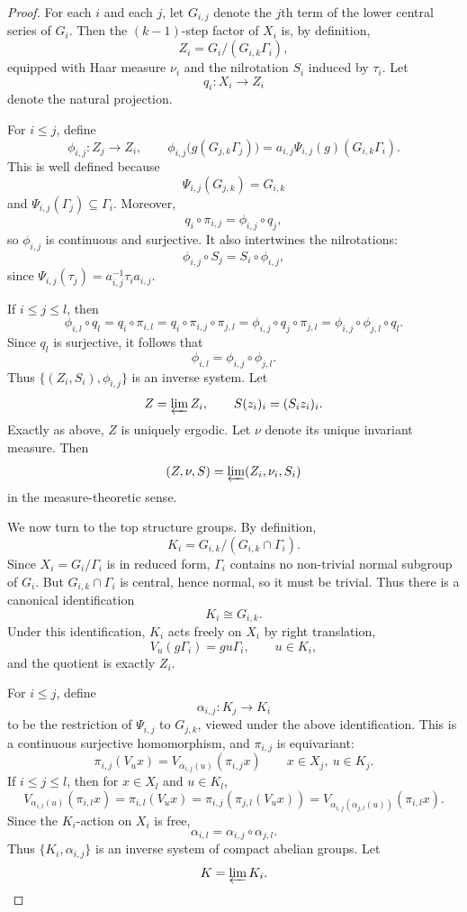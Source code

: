 \documentclass[12pt]{amsart}
\theoremstyle{plain}
\theoremstyle{definition}
\begin{document}
\begin{proof}
    For each $i$ and each $j$, let $G_{i,j}$ denote the $j$th term of the lower central series of $G_i$.
    Then the $(k-1)$-step factor of $X_i$ is, by definition,
    \[
    Z_i=G_i/(G_{i,k}\Gamma_i),
    \]
    equipped with Haar measure $\nu_i$ and the nilrotation $S_i$ induced by $\tau_i$.
    Let
    \[
    q_i\colon X_i\to Z_i
    \]
    denote the natural projection.

    For $i\leq j$, define
    \[
    \phi_{i,j}\colon Z_j\to Z_i,\qquad
    \phi_{i,j}\bigl(g(G_{j,k}\Gamma_j)\bigr)
    = a_{i,j}\Psi_{i,j}(g)(G_{i,k}\Gamma_i).
    \]
    This is well defined because
    \[
    \Psi_{i,j}(G_{j,k})=G_{i,k}
    \]
    and $\Psi_{i,j}(\Gamma_j)\subseteq \Gamma_i$.
    Moreover,
    \[
    q_i\circ \pi_{i,j}=\phi_{i,j}\circ q_j,
    \]
    so $\phi_{i,j}$ is continuous and surjective.
    It also intertwines the nilrotations:
    \[
    \phi_{i,j}\circ S_j = S_i\circ \phi_{i,j},
    \]
    since $\Psi_{i,j}(\tau_j)=a_{i,j}^{-1}\tau_i a_{i,j}$.

    If $i\leq j\leq l$, then
    \[
    \phi_{i,l}\circ q_l
    = q_i\circ \pi_{i,l}
    = q_i\circ \pi_{i,j}\circ \pi_{j,l}
    = \phi_{i,j}\circ q_j\circ \pi_{j,l}
    = \phi_{i,j}\circ \phi_{j,l}\circ q_l.
    \]
    Since $q_l$ is surjective, it follows that
    \[
    \phi_{i,l}=\phi_{i,j}\circ \phi_{j,l}.
    \]
    Thus $\{(Z_i,S_i),\phi_{i,j}\}$ is an inverse system.
    Let
    \[
    Z=\varprojlim Z_i,
    \qquad
    S(z_i)_i=(S_i z_i)_i.
    \]
    Exactly as above, $Z$ is uniquely ergodic.
    Let $\nu$ denote its unique invariant measure.
    Then
    \[
    (Z,\nu,S)=\varprojlim (Z_i,\nu_i,S_i)
    \]
    in the measure-theoretic sense.

    We now turn to the top structure groups.
    By definition,
    \[
    K_i=G_{i,k}/(G_{i,k}\cap \Gamma_i).
    \]
    Since $X_i=G_i/\Gamma_i$ is in reduced form, $\Gamma_i$ contains no non-trivial normal subgroup of $G_i$.
    But $G_{i,k}\cap \Gamma_i$ is central, hence normal, so it must be trivial.
    Thus there is a canonical identification
    \[
    K_i\cong G_{i,k}.
    \]
    Under this identification, $K_i$ acts freely on $X_i$ by right translation,
    \[
    V_u(g\Gamma_i)=gu\Gamma_i,
    \qquad u\in K_i,
    \]
    and the quotient is exactly $Z_i$.

    For $i\leq j$, define
    \[
    \alpha_{i,j}\colon K_j\to K_i
    \]
    to be the restriction of $\Psi_{i,j}$ to $G_{j,k}$, viewed under the above identification.
    This is a continuous surjective homomorphism, and $\pi_{i,j}$ is equivariant:
    \[
    \pi_{i,j}(V_u x)=V_{\alpha_{i,j}(u)}(\pi_{i,j}x)
    \qquad x\in X_j,\ u\in K_j.
    \]
    If $i\leq j\leq l$, then for $x\in X_l$ and $u\in K_l$,
    \[
    V_{\alpha_{i,l}(u)}(\pi_{i,l}x)
    = \pi_{i,l}(V_u x)
    = \pi_{i,j}(\pi_{j,l}(V_u x))
    = V_{\alpha_{i,j}(\alpha_{j,l}(u))}(\pi_{i,l}x).
    \]
    Since the $K_i$-action on $X_i$ is free,
    \[
    \alpha_{i,l}=\alpha_{i,j}\circ \alpha_{j,l}.
    \]
    Thus $\{K_i,\alpha_{i,j}\}$ is an inverse system of compact abelian groups.
    Let
    \[
    K=\varprojlim K_i.
    \]


\end{proof}
\end{document}
